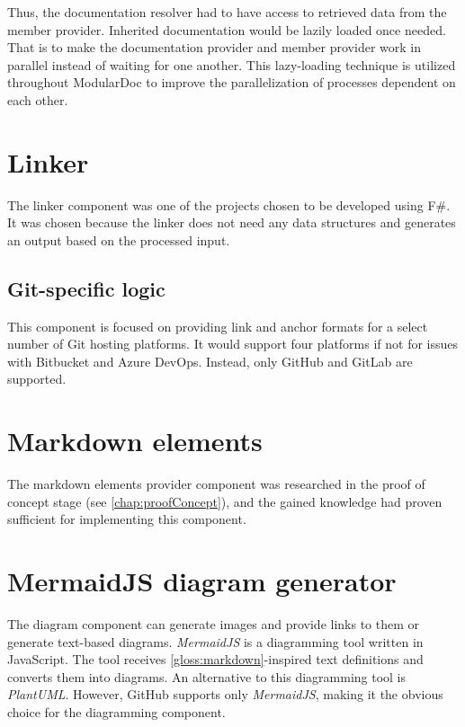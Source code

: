 Thus, the documentation resolver had to have access to retrieved data from the member provider. Inherited documentation would be lazily loaded once needed. That is to make the documentation provider and member provider work in parallel instead of waiting for one another. This lazy-loading technique is utilized throughout ModularDoc to improve the parallelization of processes dependent on each other.

\section{Linker} \label{sec:linker}

The linker component was one of the projects chosen to be developed using F\#. It was chosen because the linker does not need any data structures and generates an output based on the processed input.

\subsection{Git-specific logic}

This component is focused on providing link and anchor formats for a select number of Git hosting platforms. It would support four platforms if not for issues with Bitbucket and Azure DevOps. Instead, only GitHub and GitLab are supported.

\section{Markdown elements}

The markdown elements provider component was researched in the proof of concept stage (see \ref{chap:proofConcept}), and the gained knowledge had proven sufficient for implementing this component.

\section{MermaidJS diagram generator}

The diagram component can generate images and provide links to them or generate text-based diagrams. \textit{MermaidJS} is a diagramming tool written in JavaScript. The tool receives \ref{gloss:markdown}-inspired text definitions and converts them into diagrams. An alternative to this diagramming tool is \textit{PlantUML}. However, GitHub supports only \textit{MermaidJS}, making it the obvious choice for the diagramming component.

